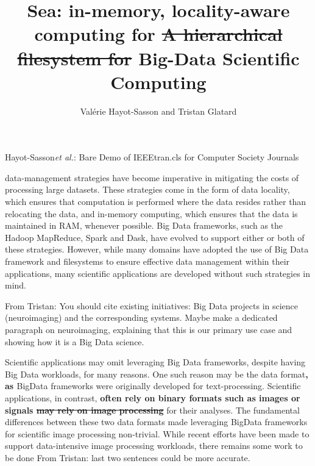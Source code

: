 \documentclass[10pt,journal,compsoc]{IEEEtran}
\newcommand{\suggestion}[2]{\textbf{\color{OliveGreen}#1 \st{#2}\color{black}}}
\newcommand{\tristan}[1]{\color{blue}From Tristan: #1\color{black}}
\begin{document}
\title{Sea: \suggestion{in-memory, locality-aware computing for}{A hierarchical filesystem for} Big-Data Scientific Computing}

\author{Val\'erie Hayot-Sasson and Tristan Glatard}

%
{Hayot-Sasson\MakeLowercase{\textit{et al.}}: Bare Demo of IEEEtran.cls for Computer Society Journals}
\IEEEtitleabstractindextext{%
\begin{abstract}
\end{abstract}
}


\maketitle


\IEEEdisplaynontitleabstractindextext
\IEEEpeerreviewmaketitle



 data-management strategies have become imperative in 
mitigating the costs of processing large datasets. These strategies come in the form
of data locality, which ensures that computation is performed where the data resides
rather than relocating the data, and in-memory computing, which ensures that the data is
maintained in RAM, whenever possible. Big Data frameworks, such as the Hadoop MapReduce, Spark and Dask,
have evolved to support either or both of these strategies.
However, while many domains have adopted the use of Big Data framework and filesystems to ensure effective data
management within their applications, many scientific applications are developed without such strategies in mind.

\tristan{You should cite existing initiatives: Big Data projects in science (neuroimaging) and the corresponding systems. Maybe make a dedicated paragraph on neuroimaging, explaining that 
this is our primary use case and showing how it is a Big Data science.}

Scientific applications may omit leveraging Big Data frameworks, despite having Big Data workloads,
for many reasons. One such reason may be the data format\suggestion{, as}{} BigData frameworks were originally developed
for text-processing. Scientific applications, in contrast, \suggestion{often rely on binary formats such as images or signals}{may rely on image processing} for their
analyses. The fundamental differences between these two data formats made leveraging BigData frameworks for
scientific image processing non-trivial. While recent efforts have been made to support data-intensive
image processing workloads, there remains some work to be done \tristan{last two sentences could be more accurate}.
\end{document}
